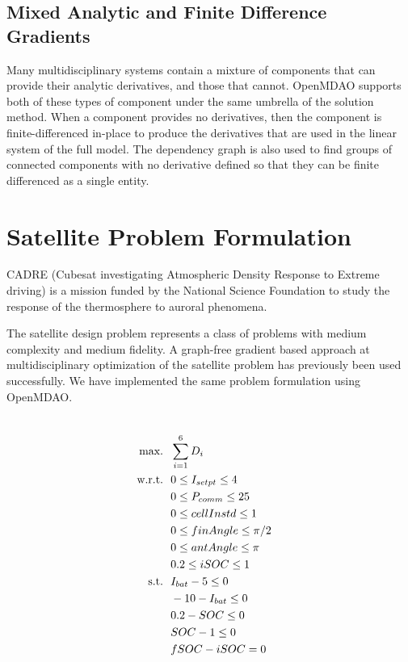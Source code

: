 \documentclass[]{aiaa-tc} %
\newcommand{\txt}{\textrm}
\begin{document}
    \subsection{Mixed Analytic and Finite Difference Gradients}

    Many multidisciplinary systems contain a mixture of components that can provide their analytic derivatives, and
    those that cannot. OpenMDAO supports both of these types of component under the same umbrella of the
    solution method. When a component provides no derivatives, then the component is finite-differenced in-place to
    produce the derivatives that are used in the linear system of the full model. The dependency graph is also used
    to find groups of connected components with no derivative defined so that they can be finite differenced as a single entity.

  \section{Satellite Problem Formulation}

  CADRE (Cubesat investigating Atmospheric Density Response to Extreme driving)
  is a mission funded by the National Science Foundation to study the
  response of the thermosphere to auroral phenomena\cite{cutler2011cubesat}.

  The satellite design problem represents a class of problems with medium complexity and medium fidelity.
  A graph-free gradient based approach at multidisciplinary optimization of the satellite
  problem has previously been used successfully\cite{CADRE2012}. We have implemented
  the same problem formulation using OpenMDAO.

    \begin{align}
        \\\txt{max.} &\ \ \sum_{i=1}^6 D_i \notag
        \\\txt{w.r.t.} & \ \ 0 \le I_{setpt} \le 4 \notag
        \\     & \ \ 0 \le P_{comm} \le 25 \notag
        \\     & \ \ 0 \le cellInstd \le 1 \notag
        \\     & \ \ 0 \le finAngle \le \pi/2 \notag
        \\     & \ \ 0 \le antAngle \le \pi \notag
        \\     & \ \ 0.2 \le iSOC \le 1 \notag
        \\\txt{s.t.} & \ \ I_{bat} - 5 \le 0 \notag
        \\     & \ \ -10 - I_{bat} \le 0 \notag
        \\     & \ \ 0.2 - SOC \le 0 \notag
        \\     & \ \ SOC - 1 \le 0 \notag
        \\     & \ \ fSOC - iSOC = 0 \notag
        \label{eqn:sellar_formulation}
    \end{align}
\end{document}
